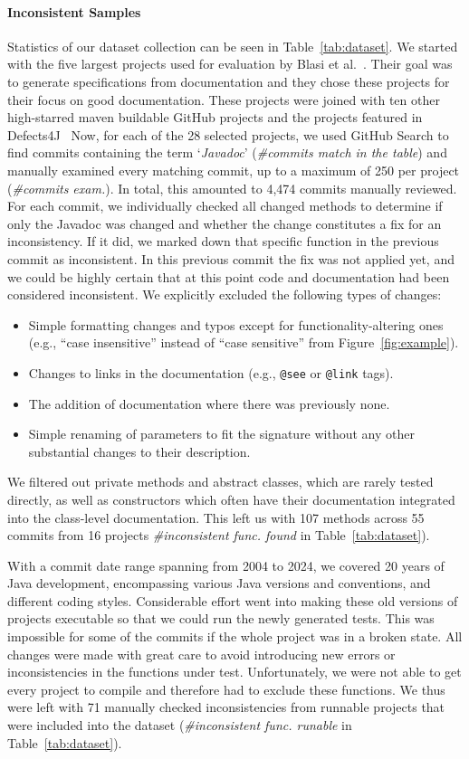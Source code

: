 \documentclass[acmsmall, screen]{acmart}
\begin{document}
\paragraph{Inconsistent Samples}
Statistics of our dataset collection can be seen in Table~\ref{tab:dataset}.
We started with the five largest projects used for evaluation by Blasi et al.~\cite{jdoctor}. 
Their goal was to generate specifications from documentation and they chose these projects for their focus on good documentation.
These projects were joined with ten other high-starred maven buildable GitHub projects and the projects featured in Defects4J~\cite{defects4j}
Now, for each of the 28 selected projects, we used GitHub Search to find commits containing the term `\textit{Javadoc}' (\textit{\#commits match in the table})
and manually examined every matching commit, up to a maximum of 250 per project (\textit{\#commits exam.}). In total, this amounted to 4,474 commits manually reviewed.
For each commit, we individually checked all changed methods to determine if only the Javadoc was changed and whether the change constitutes a fix for an inconsistency. If it did, we marked down that specific function in the previous commit as inconsistent. In this previous commit the fix was not applied yet, and we could be highly certain that at this point code and documentation had been considered inconsistent. 
We explicitly excluded the following types of changes:
\begin{itemize}
    \item Simple formatting changes and typos except for functionality-altering ones (e.g., ``case insensitive'' instead of ``case sensitive'' from Figure~\ref{fig:example}).
    \item Changes to links in the documentation (e.g., \texttt{@see} or \texttt{@link} tags).
    \item The addition of documentation where there was previously none.
    \item Simple renaming of parameters to fit the signature without any other substantial changes to their description.
\end{itemize}
We filtered out private methods and abstract classes, which are rarely tested directly, as well as constructors which often have their documentation integrated into the class-level documentation.
This left us with 107 methods across 55 commits from 16 projects \textit{\#inconsistent func. found} in Table~\ref{tab:dataset}).

With a commit date range spanning from 2004 to 2024, we covered 20 years of Java development, encompassing various Java versions and conventions, and different coding styles. Considerable effort went into making these old versions of projects executable so that we could run the newly generated tests. This was impossible for some of the commits if the whole project was in a broken state. 
All changes were made with great care to avoid introducing new errors or inconsistencies in the functions under test. Unfortunately, we were not able to get every project to compile and therefore had to exclude these functions. We thus were left with 71 manually checked inconsistencies from runnable projects that were included into the dataset (\textit{\#inconsistent func. runable} in Table~\ref{tab:dataset}).
\end{document}
